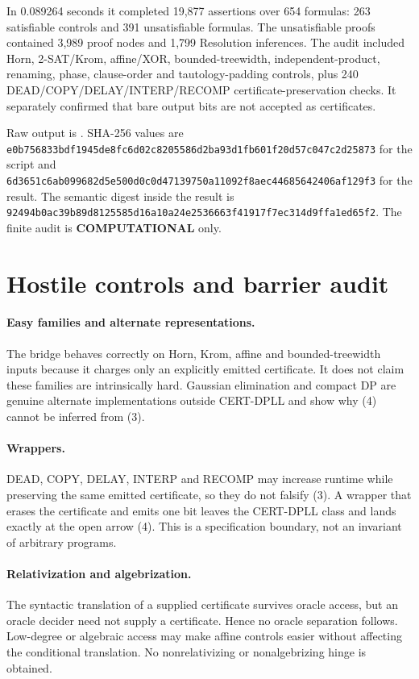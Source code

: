 \documentclass[11pt]{article}
\newcommand{\COMP}{\textbf{COMPUTATIONAL}}
\begin{document}
In 0.089264 seconds it completed 19,877 assertions over 654 formulas:
263 satisfiable controls and 391 unsatisfiable formulas.  The unsatisfiable
proofs contained 3,989 proof nodes and 1,799 Resolution inferences.  The audit
included Horn, 2-SAT/Krom, affine/XOR, bounded-treewidth, independent-product,
renaming, phase, clause-order and tautology-padding controls, plus 240
DEAD/COPY/DELAY/INTERP/RECOMP certificate-preservation checks.  It separately
confirmed that bare output bits are not accepted as certificates.

Raw output is
.
SHA-256 values are
\texttt{e0b756833bdf1945de8fc6d02c8205586d2ba93d1fb601f20d57c047c2d25873}
for the script and
\texttt{6d3651c6ab099682d5e500d0c0d47139750a11092f8aec44685642406af129f3}
for the result.  The semantic digest inside the result is
\texttt{92494b0ac39b89d8125585d16a10a24e2536663f41917f7ec314d9ffa1ed65f2}.
The finite audit is \COMP{} only.

\section{Hostile controls and barrier audit}
\paragraph{Easy families and alternate representations.}
The bridge behaves correctly on Horn, Krom, affine and bounded-treewidth
inputs because it charges only an explicitly emitted certificate.  It does
not claim these families are intrinsically hard.  Gaussian elimination and
compact DP are genuine alternate implementations outside CERT-DPLL and show
why (4) cannot be inferred from (3).

\paragraph{Wrappers.}
DEAD, COPY, DELAY, INTERP and RECOMP may increase runtime while preserving the
same emitted certificate, so they do not falsify (3).  A wrapper that erases
the certificate and emits one bit leaves the CERT-DPLL class and lands exactly
at the open arrow (4).  This is a specification boundary, not an invariant of
arbitrary programs.

\paragraph{Relativization and algebrization.}
The syntactic translation of a supplied certificate survives oracle access,
but an oracle decider need not supply a certificate.  Hence no oracle
separation follows.  Low-degree or algebraic access may make affine controls
easier without affecting the conditional translation.  No nonrelativizing or
nonalgebrizing hinge is obtained.
\end{document}
